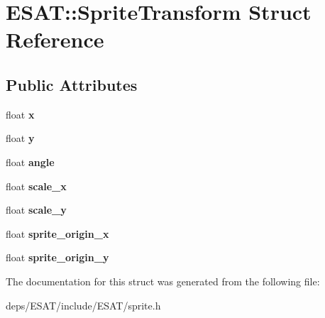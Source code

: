 \hypertarget{struct_e_s_a_t_1_1_sprite_transform}{}\section{E\+S\+AT\+:\+:Sprite\+Transform Struct Reference}
\label{struct_e_s_a_t_1_1_sprite_transform}
\subsection*{Public Attributes}
\begin{DoxyCompactItemize}
\item 
\mbox{\label{struct_e_s_a_t_1_1_sprite_transform_a6957a55ad5b47e8961d7efcd7f2a37de}} 
float {\bfseries x}
\item 
\mbox{\label{struct_e_s_a_t_1_1_sprite_transform_acb0cdc468b660f7d274a533613196e0b}} 
float {\bfseries y}
\item 
\mbox{\label{struct_e_s_a_t_1_1_sprite_transform_ae14e30796ad3662c7d90246cec556e62}} 
float {\bfseries angle}
\item 
\mbox{\label{struct_e_s_a_t_1_1_sprite_transform_af5e4371f5bb605c2655ddb9df577ccf1}} 
float {\bfseries scale\+\_\+x}
\item 
\mbox{\label{struct_e_s_a_t_1_1_sprite_transform_aa76ca0269e377f60776089fd52d7fc44}} 
float {\bfseries scale\+\_\+y}
\item 
\mbox{\label{struct_e_s_a_t_1_1_sprite_transform_aeb05af8d0d355cb38d7948b82ed96ee3}} 
float {\bfseries sprite\+\_\+origin\+\_\+x}
\item 
\mbox{\label{struct_e_s_a_t_1_1_sprite_transform_a0b09053286d716a3dc2c8b8379b81e79}} 
float {\bfseries sprite\+\_\+origin\+\_\+y}
\end{DoxyCompactItemize}


The documentation for this struct was generated from the following file\+:\begin{DoxyCompactItemize}
\item 
deps/\+E\+S\+A\+T/include/\+E\+S\+A\+T/sprite.\+h\end{DoxyCompactItemize}
